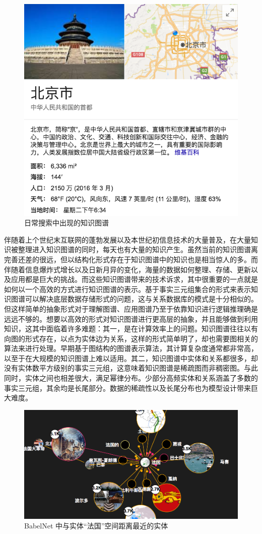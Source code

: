 \vspace{25pt}
\begin{figure}[h]
\setlength{\abovecaptionskip}{30pt} 
\centering
\includegraphics[width=0.6\columnwidth]{figures/ch1/knowledge.png}
\caption{日常搜索中出现的知识图谱}
\label{ch1:google_kg_example}
\end{figure}

伴随着上个世纪末互联网的蓬勃发展以及本世纪初信息技术的大量普及，在大量知识被整理进入知识图谱的同时，每天也有大量的知识产生。虽然当前的知识图谱离完善还差的很远，但以结构化形式存在于知识图谱中的知识也是相当惊人的多。而伴随着信息爆炸式增长以及日新月异的变化，海量的数据如何整理、存储、更新以及应用都是巨大的挑战。而这些知识图谱带来的技术诉求，其中很重要的一点就是如何以一个高效的方式进行知识图谱的表示。基于事实三元组集合的形式来表示知识图谱可以解决底层数据存储形式的问题，这与关系数据库的模式是十分相似的。但这样简单的抽象形式对于理解图谱、应用图谱乃至于依靠知识进行逻辑推理确是远远不够的。想要以高效的形式对知识图谱进行更高层的抽象，并且能够做到利用知识，这其中面临着许多难题：其一，是在计算效率上的问题。知识图谱往往以有向图的形式存在，以点为实体边为关系，这样的形式简单明了，却也需要图相关的算法来进行处理。早期基于图结构的图谱表示算法，其计算复杂度通常都非常高，以至于在大规模的知识图谱上难以适用。其二，知识图谱中实体和关系都很多，却没有实体数平方级别的事实三元组，这意味着知识图谱是稀疏图而非稠密图。与此同时，实体之间也相差很大，满足幂律分布。少部分高频实体和关系涵盖了多数的事实三元组，其余均是长尾部分。数据的稀疏性以及长尾分布也为模型设计带来巨大难度。

\vspace{25pt}
\begin{figure}[h]
\setlength{\abovecaptionskip}{30pt} 
\centering
\includegraphics[width=0.9\columnwidth]{figures/ch1/space.png}
\caption{BabelNet 中与实体``法国''空间距离最近的实体}
\label{ch1:space}
\end{figure}


